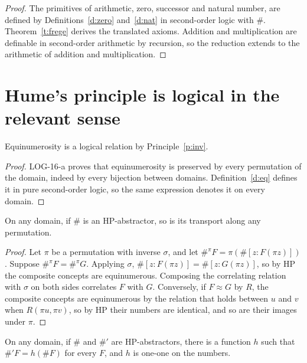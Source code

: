 \documentclass{situationist-preprint}
\begin{document}
\begin{proof}
The primitives of arithmetic, zero, successor and natural number, are defined by Definitions~\ref{d:zero} and~\ref{d:nat} in second-order logic with $\#$. Theorem~\ref{t:frege} derives the translated axioms. Addition and multiplication are definable in second-order arithmetic by recursion, so the reduction extends to the arithmetic of addition and multiplication.
\end{proof}

\section{Hume's principle is logical in the relevant sense}\label{s:logical}

\begin{proposition}\label{p:eqinv}
Equinumerosity is a logical relation by Principle~\ref{p:inv}.
\end{proposition}

\begin{proof}
LOG-16-a proves that equinumerosity is preserved by every permutation of the domain, indeed by every bijection between domains. Definition~\ref{d:eq} defines it in pure second-order logic, so the same expression denotes it on every domain.
\end{proof}

\begin{proposition}[Transport]\label{p:transport}
On any domain, if $\#$ is an HP-abstractor, so is its transport along any permutation.
\end{proposition}

\begin{proof}
Let $\pi$ be a permutation with inverse $\sigma$, and let $\#^\pi F = \pi(\#[z : F(\pi z)])$. Suppose $\#^\pi F = \#^\pi G$. Applying $\sigma$, $\#[z : F(\pi z)] = \#[z : G(\pi z)]$, so by HP the composite concepts are equinumerous. Composing the correlating relation with $\sigma$ on both sides correlates $F$ with $G$. Conversely, if $F \approx G$ by $R$, the composite concepts are equinumerous by the relation that holds between $u$ and $v$ when $R(\pi u, \pi v)$, so by HP their numbers are identical, and so are their images under $\pi$.
\end{proof}

\begin{proposition}\label{p:unique}
On any domain, if $\#$ and $\#'$ are HP-abstractors, there is a function $h$ such that $\#' F = h(\# F)$ for every $F$, and $h$ is one-one on the numbers.
\end{proposition}
\end{document}
